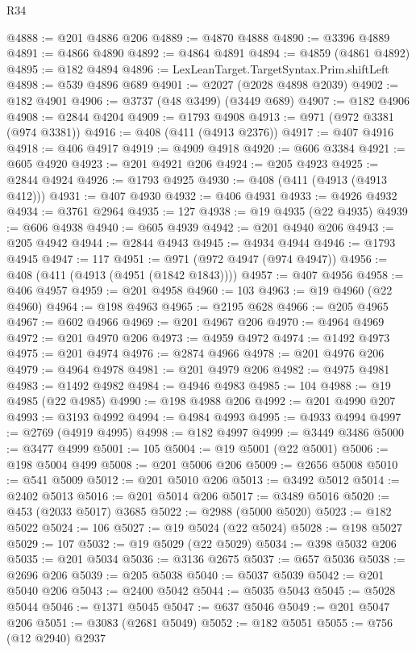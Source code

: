 \begin{lexlean}{R34}
\begin{coremodule}
@4888 := @201 @4886 @206
@4889 := @4870 @4888
@4890 := @3396 @4889
@4891 := @4866 @4890
@4892 := @4864 @4891
@4894 := @4859 (@4861 @4892)
@4895 := @182 @4894
@4896 := LexLeanTarget.TargetSyntax.Prim.shiftLeft
@4898 := @539 @4896 @689
@4901 := @2027 (@2028 @4898 @2039)
@4902 := @182 @4901
@4906 := @3737 (@48 @3499) (@3449 @689)
@4907 := @182 @4906
@4908 := @2844 @4204
@4909 := @1793 @4908
@4913 := @971 (@972 @3381 (@974 @3381))
@4916 := @408 (@411 (@4913 @2376))
@4917 := @407 @4916
@4918 := @406 @4917
@4919 := @4909 @4918
@4920 := @606 @3384
@4921 := @605 @4920
@4923 := @201 @4921 @206
@4924 := @205 @4923
@4925 := @2844 @4924
@4926 := @1793 @4925
@4930 := @408 (@411 (@4913 (@4913 @412)))
@4931 := @407 @4930
@4932 := @406 @4931
@4933 := @4926 @4932
@4934 := @3761 @2964
@4935 := 127
@4938 := @19 @4935 (@22 @4935)
@4939 := @606 @4938
@4940 := @605 @4939
@4942 := @201 @4940 @206
@4943 := @205 @4942
@4944 := @2844 @4943
@4945 := @4934 @4944
@4946 := @1793 @4945
@4947 := 117
@4951 := @971 (@972 @4947 (@974 @4947))
@4956 := @408 (@411 (@4913 (@4951 (@1842 @1843))))
@4957 := @407 @4956
@4958 := @406 @4957
@4959 := @201 @4958
@4960 := 103
@4963 := @19 @4960 (@22 @4960)
@4964 := @198 @4963
@4965 := @2195 @628
@4966 := @205 @4965
@4967 := @602 @4966
@4969 := @201 @4967 @206
@4970 := @4964 @4969
@4972 := @201 @4970 @206
@4973 := @4959 @4972
@4974 := @1492 @4973
@4975 := @201 @4974
@4976 := @2874 @4966
@4978 := @201 @4976 @206
@4979 := @4964 @4978
@4981 := @201 @4979 @206
@4982 := @4975 @4981
@4983 := @1492 @4982
@4984 := @4946 @4983
@4985 := 104
@4988 := @19 @4985 (@22 @4985)
@4990 := @198 @4988 @206
@4992 := @201 @4990 @207
@4993 := @3193 @4992
@4994 := @4984 @4993
@4995 := @4933 @4994
@4997 := @2769 (@4919 @4995)
@4998 := @182 @4997
@4999 := @3449 @3486
@5000 := @3477 @4999
@5001 := 105
@5004 := @19 @5001 (@22 @5001)
@5006 := @198 @5004 @499
@5008 := @201 @5006 @206
@5009 := @2656 @5008
@5010 := @541 @5009
@5012 := @201 @5010 @206
@5013 := @3492 @5012
@5014 := @2402 @5013
@5016 := @201 @5014 @206
@5017 := @3489 @5016
@5020 := @453 (@2033 @5017) @3685
@5022 := @2988 (@5000 @5020)
@5023 := @182 @5022
@5024 := 106
@5027 := @19 @5024 (@22 @5024)
@5028 := @198 @5027
@5029 := 107
@5032 := @19 @5029 (@22 @5029)
@5034 := @398 @5032 @206
@5035 := @201 @5034
@5036 := @3136 @2675
@5037 := @657 @5036
@5038 := @2696 @206
@5039 := @205 @5038
@5040 := @5037 @5039
@5042 := @201 @5040 @206
@5043 := @2400 @5042
@5044 := @5035 @5043
@5045 := @5028 @5044
@5046 := @1371 @5045
@5047 := @637 @5046
@5049 := @201 @5047 @206
@5051 := @3083 (@2681 @5049)
@5052 := @182 @5051
@5055 := @756 (@12 @2940) @2937

\end{coremodule}
\end{lexlean}
